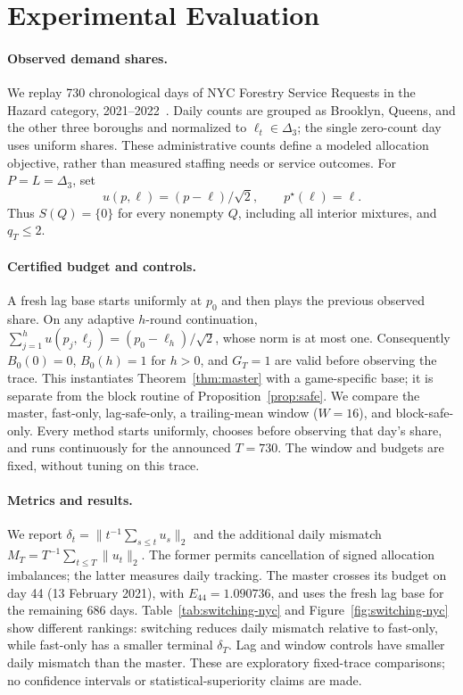 \providecommand{\AAMASExperimentFigureDir}{figures}

\section{Experimental Evaluation}
\label{sec:cage-experiments}
\label{sec:switching-experiments}

\paragraph{Observed demand shares.}
We replay 730 chronological days of NYC Forestry Service Requests in the
Hazard category, 2021--2022~\cite{nycforestry2026}. Daily counts are grouped
as Brooklyn, Queens, and the other three boroughs and normalized to
$\ell_t\in\Delta_3$; the single zero-count day uses uniform shares.
These administrative counts define a modeled allocation objective, rather
than measured staffing needs or service outcomes. For
$P=L=\Delta_3$, set
\[
 u(p,\ell)=(p-\ell)/\sqrt2,\qquad p^\star(\ell)=\ell.
\]
Thus $S(Q)=\{0\}$ for every nonempty $Q$, including all interior mixtures,
and $q_T\le2$.

\paragraph{Certified budget and controls.}
A fresh lag base starts uniformly at $p_0$ and then plays the previous
observed share. On any adaptive $h$-round continuation,
$\sum_{j=1}^h u(p_j,\ell_j)=(p_0-\ell_h)/\sqrt2$, whose norm is at most one.
Consequently $B_0(0)=0$, $B_0(h)=1$ for $h>0$, and $G_T=1$ are valid
before observing the trace. This instantiates Theorem~\ref{thm:master}
with a game-specific base; it is separate from the block routine of
Proposition~\ref{prop:safe}.
We compare the master, fast-only, lag-safe-only, a trailing-mean window
($W=16$), and block-safe-only. Every method starts uniformly, chooses
before observing that day's share, and runs continuously for the announced
$T=730$. The window and budgets are fixed, without tuning on this trace.

\paragraph{Metrics and results.}
We report $\delta_t=\|t^{-1}\sum_{s\le t}u_s\|_2$ and the additional daily
mismatch $M_T=T^{-1}\sum_{t\le T}\|u_t\|_2$. The former permits cancellation
of signed allocation imbalances; the latter measures daily tracking.
The master crosses its budget on day 44 (13 February 2021), with
$E_{44}=1.090736$, and uses the fresh lag base for the remaining 686 days.
Table~\ref{tab:switching-nyc} and Figure~\ref{fig:switching-nyc} show different
rankings: switching reduces daily mismatch relative to fast-only, while
fast-only has a smaller terminal $\delta_T$. Lag and window controls have
smaller daily mismatch than the master. These are exploratory fixed-trace
comparisons; no confidence intervals or statistical-superiority claims are made.

